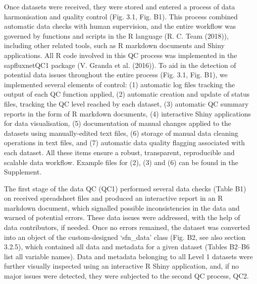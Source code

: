 \documentclass[11pt,twoside]{reedthesis}
\begin{document}
Once datasets were received, they were stored and entered a process of
data harmonisation and quality control (Fig. 3.1, Fig. B1). This process
combined automatic data checks with human supervision, and the entire
workflow was governed by functions and scripts in the R language (R. C.
Team (2018)), including other related tools, such as R markdown
documents and Shiny applications. All R code involved in this QC process
was implemented in the sapfluxnetQC1 package (V. Granda et al. (2016)).
To aid in the detection of potential data issues throughout the entire
process (Fig. 3.1, Fig. B1), we implemented several elements of control:
(1) automatic log files tracking the output of each QC function applied,
(2) automatic creation and update of status files, tracking the QC level
reached by each dataset, (3) automatic QC summary reports in the form of
R markdown documents, (4) interactive Shiny applications for data
visualisation, (5) documentation of manual changes applied to the
datasets using manually-edited text files, (6) storage of manual data
cleaning operations in text files, and (7) automatic data quality
flagging associated with each dataset. All these items ensure a robust,
transparent, reproducible and scalable data workflow. Example files for
(2), (3) and (6) can be found in the Supplement.\par

The first stage of the data QC (QC1) performed several data checks
(Table B1) on received spreadsheet files and produced an interactive
report in an R markdown document, which signalled possible
inconsistencies in the data and warned of potential errors. These data
issues were addressed, with the help of data contributors, if needed.
Once no errors remained, the dataset was converted into an object of the
custom-designed `sfn\_data' class (Fig. B2, see also section 3.2.5),
which contained all data and metadata for a given dataset (Tables B2--B6
list all variable names). Data and metadata belonging to all Level 1
datasets were further visually inspected using an interactive R Shiny
application, and, if no major issues were detected, they were subjected
to the second QC process, QC2.\par
\end{document}
